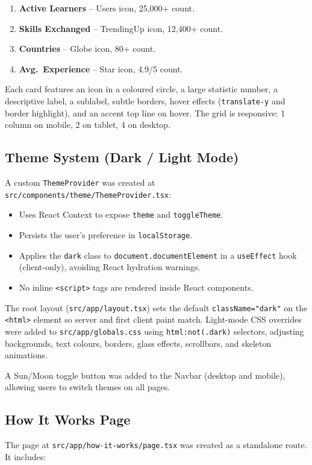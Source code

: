 \documentclass[12pt,a4paper]{report}
\begin{document}
\begin{enumerate}[noitemsep]
  \item \textbf{Active Learners} -- Users icon, 25,000+ count.
  \item \textbf{Skills Exchanged} -- TrendingUp icon, 12,400+ count.
  \item \textbf{Countries} -- Globe icon, 80+ count.
  \item \textbf{Avg.\ Experience} -- Star icon, 4.9/5 count.
\end{enumerate}

\noindent Each card features an icon in a coloured circle, a large statistic
number, a descriptive label, a sublabel, subtle borders, hover effects
(\texttt{translate-y} and border highlight), and an accent top line on hover.
The grid is responsive: 1 column on mobile, 2 on tablet, 4 on desktop.

\subsection{Theme System (Dark / Light Mode)}
A custom \texttt{ThemeProvider} was created at
\texttt{src/components/theme/ThemeProvider.tsx}:

\begin{itemize}[noitemsep]
  \item Uses React Context to expose \texttt{theme} and \texttt{toggleTheme}.
  \item Persists the user's preference in \texttt{localStorage}.
  \item Applies the \texttt{dark} class to \texttt{document.documentElement} in
        a \texttt{useEffect} hook (client-only), avoiding React hydration
        warnings.
  \item No inline \texttt{<script>} tags are rendered inside React components.
\end{itemize}

The root layout (\texttt{src/app/layout.tsx}) sets the default
\texttt{className="dark"} on the \texttt{<html>} element so server and first
client paint match.  Light-mode CSS overrides were added to
\texttt{src/app/globals.css} using \texttt{html:not(.dark)} selectors,
adjusting backgrounds, text colours, borders, glass effects, scrollbars, and
skeleton animations.

A Sun/Moon toggle button was added to the Navbar (desktop and mobile), allowing
users to switch themes on all pages.

\subsection{How It Works Page}
The page at \texttt{src/app/how-it-works/page.tsx} was created as a standalone
route.  It includes:
\end{document}
